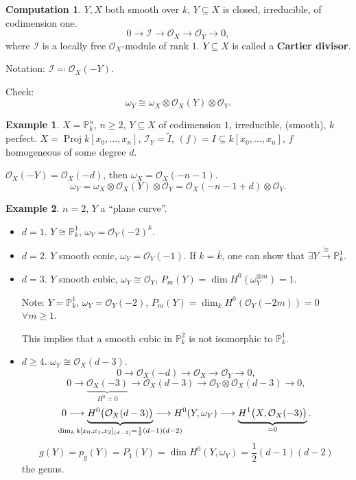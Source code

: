 \documentclass[12pt]{article}
\DeclareMathOperator{\Proj}{Proj}
\theoremstyle{definition}
\newtheorem*{example}{Example}
\newtheorem*{computation}{Computation}
\begin{document}
\begin{computation}
$Y,X$ both smooth over $k$, $Y\subseteq X$ is closed, irreducible, of codimension one.
\[0\longrightarrow\mathcal I\longrightarrow\mathcal O_X\longrightarrow\mathcal O_Y\longrightarrow0,\]
where $\mathcal I$ is a locally free $\mathcal O_X$-module of rank $1$. $Y\subseteq X$ is called a \textbf{Cartier divisor}.

Notation: $\mathcal I\eqqcolon\mathcal O_X(-Y)$.

Check:
\[\omega_Y\cong\omega_X\otimes\mathcal O_X(Y)\otimes\mathcal O_Y.\]

\begin{example}
$X=\mathbb P_k^n$, $n\geq2$, $Y\subseteq X$ of codimension $1$, irreducible, (smooth), $k$ perfect. $X=\Proj k[x_0,\ldots,x_n]$, $\mathcal I_Y=\widetilde I$, $(f)=I\subseteq k[x_0,\ldots,x_n]$, $f$ homogeneous of some degree $d$.

$\mathcal O_X(-Y)=\mathcal O_X(-d)$, then $\omega_X=\mathcal O_X(-n-1)$.
\[\omega_Y=\omega_X\otimes\mathcal O_X(Y)\otimes\mathcal O_Y=\mathcal O_X(-n-1+d)\otimes\mathcal O_Y.\]
\end{example}

\begin{example}
$n=2$, $Y$ a ``plane curve''.

\begin{itemize}
\item $d=1$. $Y\cong\mathbb P_k^1$, $\omega_Y=\mathcal O_Y(-2)^k$.

\item $d=2$. $Y$ smooth conic, $\omega_Y=\mathcal O_Y(-1)$. If $k=\overline k$, one can show that $\exists Y\xrightarrow\cong\mathbb P_k^1$.

\item $d=3$. $Y$ smooth cubic, $\omega_Y\cong\mathcal O_Y$, $P_m(Y)=\dim H^0(\omega_Y^{\otimes m})=1$.

Note: $Y=\mathbb P_k^1$, $\omega_Y=\mathcal O_Y(-2)$, $P_m(Y)=\dim_kH^0(\mathcal O_Y(-2m))=0$ $\forall m\geq1$.

This implies that a smooth cubic in $\mathbb P_k^2$ is not isomorphic to $\mathbb P_k^1$.

\item $d\geq4$. $\omega_Y\cong\mathcal O_X(d-3)$.
\[0\longrightarrow\mathcal O_X(-d)\longrightarrow\mathcal O_X\longrightarrow\mathcal O_Y\longrightarrow0,\]
\[0\longrightarrow\underbrace{\mathcal O_X(-3)}_{H^0=0}\longrightarrow\mathcal O_X(d-3)\longrightarrow\mathcal O_Y\otimes\mathcal O_X(d-3)\longrightarrow0,\]
\[0\longrightarrow\underbrace{H^0\big(\mathcal O_X(d-3)\big)}_{\mathclap{\dim_kk[x_0,x_1,x_2]_{(d-3)}=\frac12(d-1)(d-2)}}\longrightarrow H^0(Y,\omega_Y)\longrightarrow\underbrace{H^1\big(X,\mathcal O_X(-3)\big)}_{=0}.\]
\[g(Y)=p_g(Y)=P_1(Y)=\dim H^0(Y,\omega_Y)=\frac12(d-1)(d-2)\]
the genus.
\end{itemize}


\end{example}
\end{computation}
\end{document}

